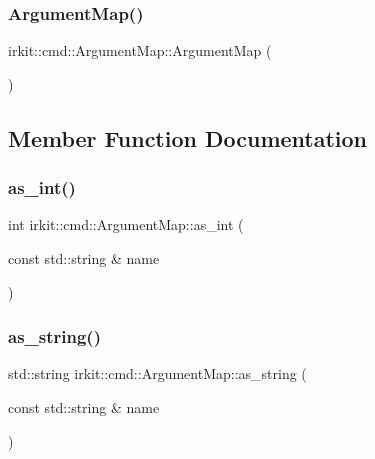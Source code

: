 \subsubsection{\texorpdfstring{Argument\+Map()}{ArgumentMap()}}
{\footnotesize\ttfamily irkit\+::cmd\+::\+Argument\+Map\+::\+Argument\+Map (\begin{DoxyParamCaption}{ }\end{DoxyParamCaption})\hspace{0.3cm}{\ttfamily [inline]}}



\subsection{Member Function Documentation}
\mbox{\label{classirkit_1_1cmd_1_1ArgumentMap_ab2b7591f8e6838d32bafc32d79adda9f}} 
\subsubsection{\texorpdfstring{as\+\_\+int()}{as\_int()}}
{\footnotesize\ttfamily int irkit\+::cmd\+::\+Argument\+Map\+::as\+\_\+int (\begin{DoxyParamCaption}\item[{const std\+::string \&}]{name }\end{DoxyParamCaption})\hspace{0.3cm}{\ttfamily [inline]}}

\mbox{\label{classirkit_1_1cmd_1_1ArgumentMap_ae53ee1be0415ee233747c4103dd33304}} 
\subsubsection{\texorpdfstring{as\+\_\+string()}{as\_string()}}
{\footnotesize\ttfamily std\+::string irkit\+::cmd\+::\+Argument\+Map\+::as\+\_\+string (\begin{DoxyParamCaption}\item[{const std\+::string \&}]{name }\end{DoxyParamCaption})\hspace{0.3cm}{\ttfamily [inline]}}


